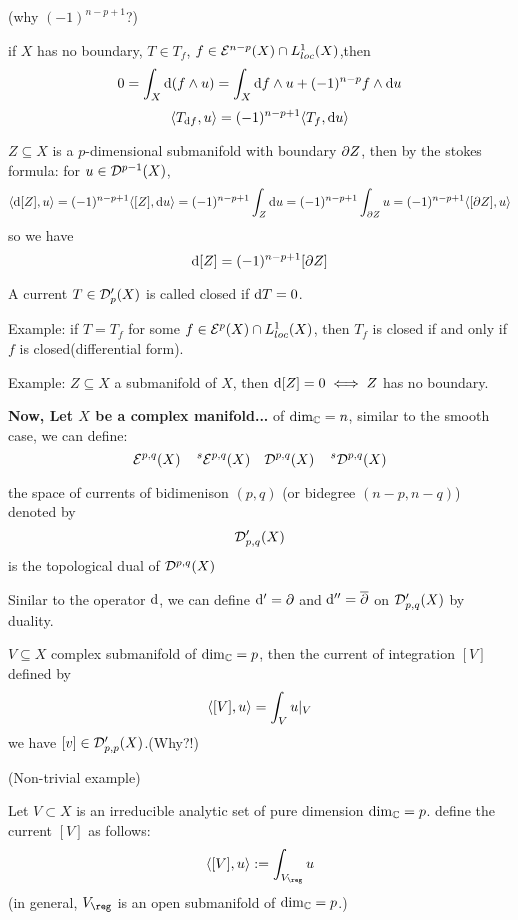 (why $(-1)^{n-p+1}$?)

\begin{rem}
if $X$ has no boundary,
$T\in T_f$, $f\in\mathcal{E}^{n-p}(X)\cap L^1_{loc}(X)$,then
$$
  0=\int_X\mathrm{d}(f\wedge u)
=\int_X\mathrm{d} f\wedge u+(-1)^{n-p}f\wedge\mathrm{d} u
$$
$$
  \langle T_{\mathrm{d} f},u \rangle
=(-1)^{n-p+1}\langle T_f,\mathrm{d} u \rangle
$$
\end{rem}

\begin{example}
$Z\subseteq X$ is a $p$-dimensional submanifold with 
boundary $\partial Z$, then by the stokes formula:
for $u\in\mathcal{D}^{p-1}(X)$,
$$
  \langle \mathrm{d}[Z],u \rangle
=
  (-1)^{n-p+1}
  \langle [Z],\mathrm{d} u \rangle
=
  (-1)^{n-p+1}\int_Z\mathrm{d} u
= (-1)^{n-p+1}\int_{\partial Z}u
= (-1)^{n-p+1}\langle [\partial Z],u \rangle
$$ 
so we have 
$$\mathrm{d}[Z]=(-1)^{n-p+1}[\partial Z]$$
\end{example}

\begin{definition}
A current $T\in\mathcal{D}'_p(X)$ is called closed
if $\mathrm{d} T=0$. 
\end{definition}

Example: if $T=T_f$ for some $f\in\mathcal{E}^p(X)\cap L^1_{loc}(X)$,
then $T_f$ is closed if and only if $f$ is closed(differential form).

Example: $Z\subseteq X$ a submanifold of $X$, then 
$\mathrm{d}[Z]=0\iff Z$ has no boundary.

\textbf{Now, Let $X$ be a complex manifold...}
of $\dim_{\mathbb{C}}=n$, similar to the smooth case,
we can define: 
$$
  \mathcal{E}^{p,q}(X)\quad
  \,^s\mathcal{E}^{p,q}(X)\quad
  \mathcal{D}^{p,q}(X)\quad
  \,^s\mathcal{D}^{p,q}(X)
$$

\begin{definition}
the space of currents of bidimenison $(p,q)$
(or bidegree $(n-p,n-q)$) denoted by
$$
  \mathcal{D}'_{p,q}(X)
$$
is the topological dual of $\mathcal{D}^{p,q}(X)$
\end{definition}

Sinilar to the operator $\mathrm{d}$, we can define
$\mathrm{d}'=\partial$ and $\mathrm{d}''=\overline{\partial}$ on $\mathcal{D}'_{p,q}(X)$
by duality.

\begin{example}
$V\subseteq X$ complex submanifold of $\dim_{\mathbb{C}}=p$,
then the current of integration $[V]$ defined by
$$
  \langle [V],u \rangle
=
  \int_V u|_V
$$
we have $[v]\in\mathcal{D}'_{p,p}(X)$.(Why?!)
\end{example}

\begin{example}(Non-trivial example)

Let $V\subset X$ is an irreducible analytic set of
pure dimension $\dim_{\mathbb{C}}=p$. define the current
$[V]$ as follows:
$$
  \pair{[V]}{u}
:=
  \int_{V_{\reg}}u
$$  
(in general, $V_{\reg}$ is an open submanifold of $\dim_{\mathbb{C}}=p$.)
\end{example}

